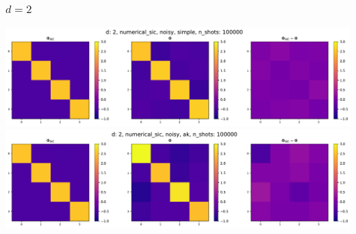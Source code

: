 \documentclass{beamer}
\begin{document}
\begin{frame}
\frametitle{$d=2$}
\begin{center}
\includegraphics[scale=0.3]{img/Phi_d2_numerical_sic_noisy_simple_n100000}
\includegraphics[scale=0.3]{img/Phi_d2_numerical_sic_noisy_ak_n100000}		
\end{center}
\end{frame}
\end{document}
